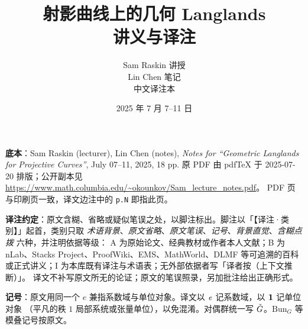 \documentclass[11pt,a4paper]{article}
\title{射影曲线上的几何 Langlands\\[0.4em]
\large 讲义与译注}
\author{Sam Raskin 讲授\\[0.2em]
Lin Chen 笔记\\[0.6em]
\small 中文译注本}
\date{2025 年 7 月 7--11 日}
\begin{document}
\maketitle

\noindent\small
\textbf{底本}：Sam Raskin (lecturer), Lin Chen (notes), \emph{Notes for ``Geometric Langlands for Projective Curves''}, July 07--11, 2025, 18 pp.
原 PDF 由 pdfTeX 于 2025-07-20 排版；公开副本见
\url{https://www.math.columbia.edu/~okounkov/Sam_lecture_notes.pdf}。
PDF 页与印刷页一致，译文边注中的 \texttt{p.N} 即指此页。

\medskip
\noindent\small
\textbf{译注约定}：原文含糊、省略或疑似笔误之处，以脚注标出。脚注以「【译注·类别】」起首，类别只取
\emph{术语背景}、\emph{原文省略}、\emph{原文笔误}、\emph{记号}、\emph{背景直觉}、\emph{含糊点拨}
六种，并注明依据等级：
A 为原始论文、经典教材或作者本人文献；B 为 nLab、Stacks Project、ProofWiki、EMS、MathWorld、DLMF
等可追溯的百科或正式讲义；I 为本库既有译注与术语表；无外部依据者写「译者按（上下文推断）」。
译文不补写原文所无的论证；原文的笔误照录，另加批注给出正确形式。

\medskip
\noindent\small
\textbf{记号}：原文用同一个 \(e\) 兼指系数域与单位对象。译文以 \(\mathit{e}\) 记系数域，以 \(\mathbf{1}\) 记单位对象
（平凡的秩 \(1\) 局部系统或张量单位），以免混淆。对偶群统一写 \(\check{G}\)。\(\mathrm{Bun}_G\) 等模叠记号按原文。

\normalsize
\newpage
\setcounter{tocdepth}{2}
{\small
\tableofcontents}
\newpage







\end{document}
